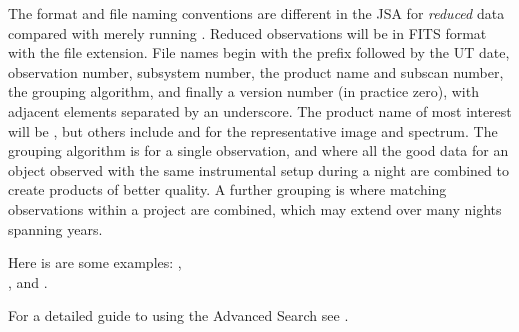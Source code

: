 \documentclass[11pt,oneside,chapters]{starlink}
\begin{document}
The format and file naming conventions are different in the JSA for
\emph{reduced} data compared with merely running \ORACDR.  Reduced
observations will be in FITS format with the  file
extension.  File names begin with the  prefix followed by
the UT date, observation number, subsystem number, the product name
and subscan number, the grouping algorithm, and finally a version
number (in practice zero), with adjacent elements separated by an
underscore.  The product name of most interest will be ,
but others include  and  for the representative
image and spectrum.  The grouping algorithm is  for a single
observation, and  where all the good data for an object observed
with the same instrumental setup during a night are combined to create
products of better quality.  A further grouping is  where
matching observations within a project are combined, which may extend
over many nights spanning years.

Here is are some examples:
, \\
, and
.

For a detailed guide to using the Advanced Search see
.


\clearpage
\end{document}
